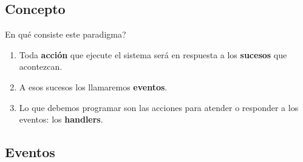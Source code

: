 \subsection{Concepto}

\begin{frame}{\textquestiondown En qu\'e consiste este paradigma?}{}

  \begin{enumerate}

    \item Toda \textbf{acci\'on} que ejecute el sistema ser\'a en respuesta a los \textbf{sucesos} que acontezcan.\newline

    \item A esos sucesos los llamaremos \textbf{eventos}.\newline

    \item Lo que debemos programar son las acciones para atender o responder a los eventos: los \textbf{handlers}.\newline

  \end{enumerate}

\end{frame}


\subsection{Eventos}

